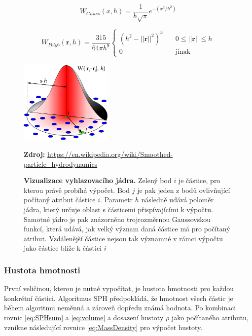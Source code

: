 \begin{equation}
	W_{Gauss}(x,h) = \frac{1}{h\sqrt{\pi}}e^{-(x^2/h^2)}
	\label{eq:1DGauss}
\end{equation}

\begin{equation}
	W_{Poly6}(\mathbf{r},h) = \frac{315}{64 \pi h^9}
	\begin{cases}
		(h^2 - ||\mathbf{r}||^2)^3 & \quad 0 \leq ||\mathbf{r}|| \leq h \\
		0                          & \quad \text{jinak}
	\end{cases}
	\label{eq:kernelPoly6}
\end{equation}

\begin{figure}[hbt]
	\centering
	\captionsetup{justification=centering}
	\includegraphics[width=0.4\textwidth]{obrazky-figures/SPHInterpolationColorsVerbose.png}
	\caption{\textbf{Vizualizace vyhlazovacího jádra.} Zelený bod $i$ je částice, pro kterou právě probíhá výpočet. Bod $j$ je pak jeden z bodů ovlivňující počítaný atribut částice $i$. Parametr $h$ následně udává poloměr jádra, který určuje oblast s částicemi přispívajícími k výpočtu. Samotné jádro je pak znázorněno trojrozměrnou Gaussovskou funkcí, která udává, jak velký význam daná částice má pro počítaný atribut. Vzdálenější částice nejsou tak významné v rámci výpočtu jako částice blíže k částici $i$}
	\textbf{Zdroj: } \url{https://en.wikipedia.org/wiki/Smoothed-particle_hydrodynamics}
	\label{fig:Kernel}
\end{figure}

\subsubsection{Hustota hmotnosti}
První veličinou, kterou je nutné vypočítat, je hustota hmotnosti pro každou konkrétní částici. Algoritmus SPH předpokládá, že hmotnost všech částic je během algoritmu neměnná a zároveň dopředu známá hodnota. Po kombinaci rovnic \ref{eq:SPHsum} a \ref{eq:volume} a dosazení hustoty $\rho$ jako počítaného atributu, vznikne následující rovnice \ref{eq:MassDensity} pro výpočet hustoty.


